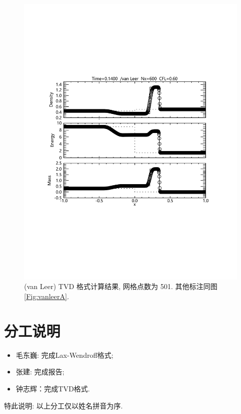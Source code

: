 \documentclass[10.5pt
]{article}
\begin{document}
\begin{figure}
\begin{center}
\includegraphics[width=.85\textwidth]{fig_tvd_2.pdf}
\caption{(van Leer) TVD 格式计算结果, 网格点数为 501. 其他标注同图\ref{Fig:vanleerA}.}\label{Fig:vanLeerB}
\end{center}
\end{figure}

\section*{分工说明}

\begin{itemize}
	\item 毛东巍: 完成Lax-Wendroff格式;
	\item 张建: 完成报告;
	\item 钟志辉：完成TVD格式.
\end{itemize}
特此说明: 以上分工仅以姓名拼音为序.
\end{document}
